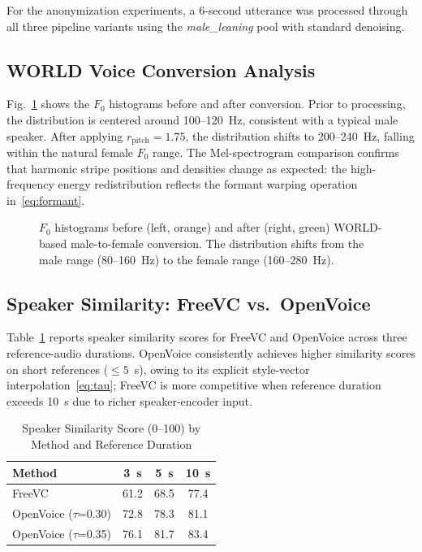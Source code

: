 \documentclass[conference]{IEEEtran}
\begin{document}
For the anonymization experiments, a 6-second utterance was processed
through all three pipeline variants using the \textit{male\_leaning}
pool with standard denoising.

\subsection{WORLD Voice Conversion Analysis}

Fig.~\ref{fig:f0} shows the $F_0$ histograms before and after
conversion.  Prior to processing, the distribution is centered around
100--120~Hz, consistent with a typical male speaker.
After applying $r_\text{pitch}=1.75$, the distribution shifts to
200--240~Hz, falling within the natural female $F_0$ range.
The Mel-spectrogram comparison confirms that harmonic stripe positions
and densities change as expected: the high-frequency energy
redistribution reflects the formant warping operation in~\eqref{eq:formant}.

\begin{figure}[t]
  \centering
  \fbox{\rule{0pt}{3.5cm}\hspace{\columnwidth}}
  \caption{$F_0$ histograms before (left, orange) and after (right,
  green) WORLD-based male-to-female conversion.
  The distribution shifts from the male range (80--160~Hz) to the
  female range (160--280~Hz).}
  \label{fig:f0}
\end{figure}

\subsection{Speaker Similarity: FreeVC vs.\ OpenVoice}

Table~\ref{tab:cloning} reports speaker similarity scores for FreeVC
and OpenVoice across three reference-audio durations.
OpenVoice consistently achieves higher similarity scores on short
references ($\leq 5$~s), owing to its explicit style-vector
interpolation~\eqref{eq:tau}; FreeVC is more competitive when
reference duration exceeds 10~s due to richer speaker-encoder input.

\begin{table}[t]
  \caption{Speaker Similarity Score (0--100) by Method and Reference Duration}
  \label{tab:cloning}
  \begin{center}
  \begin{tabular}{lccc}
    \toprule
    \textbf{Method} & \textbf{3~s} & \textbf{5~s} & \textbf{10~s} \\
    \midrule
    FreeVC             & 61.2 & 68.5 & 77.4 \\
    OpenVoice ($\tau$=0.30) & 72.8 & 78.3 & 81.1 \\
    OpenVoice ($\tau$=0.35) & 76.1 & 81.7 & 83.4 \\
    \bottomrule
  \end{tabular}
  \end{center}
\end{table}
\end{document}
